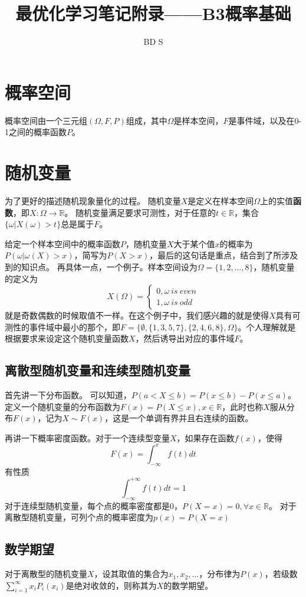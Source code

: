 \documentclass{article}
\title{最优化学习笔记附录——B3概率基础}
\author{BD S}
\begin{document}
\maketitle
\tableofcontents

\section{概率空间}
概率空间由一个三元组$(\Omega,F,P)$组成，其中$\Omega$是样本空间，$F$是事件域，以及在0-1之间的概率函数$P$。

\section{随机变量}
为了更好的描述随机现象量化的过程。
随机变量$X$是定义在样本空间$\Omega$上的实值\textbf{函数}，即$X:\Omega \rightarrow \mathbb{R}$。
随机变量满足要求可测性，对于任意的$t \in \mathbb{R}$，集合$\{\omega| X(\omega)>t\}$总是属于$F$。

给定一个样本空间中的概率函数$P$，随机变量$X$大于某个值$x$的概率为$P(\omega|\omega(X)>x)$，简写为$P(X>x)$，最后的这句话是重点，结合到了所涉及到的知识点。
再具体一点，一个例子。样本空间设为$\Omega =\{1,2,\dots,8\}$，随机变量的定义为
\begin{equation}
 X(\Omega)=\left\{
    \begin{aligned}
    0, \omega \ is \ even  \\
    1, \omega \ is \ odd  
    \end{aligned}
\right.   
\end{equation}
就是奇数偶数的时候取值不一样。在这个例子中，我们感兴趣的就是使得$X$具有可测性的事件域中最小的那个，即$F=\{\emptyset ,\{1,3,5,7\},\{2,4,6,8\},\Omega\}$。个人理解就是根据要求来设定这个随机变量函数$X$，然后诱导出对应的事件域$F$。
\subsection{离散型随机变量和连续型随机变量}
首先讲一下分布函数。
可以知道，$P(a<X \le b)=P(x \le b)-P(x \le a)$。
定义一个随机变量的分布函数为$F(x)=P(X \le x), x \in \mathbb{R}$，此时也称$X$服从分布$F(x)$，记为$X\sim F(x)$，这是一个单调有界并且右连续的函数。

再讲一下概率密度函数。对于一个连续型变量$X$，如果存在函数$f(x)$，使得$$
F(x)=\int_{-\infty}^x f(t)dt
$$
有性质$$
\int_{-\infty}^{+\infty} f(t)dt=1
$$
对于连续型随机变量，每个点的概率密度都是0，$P(X=x)=0,\forall x \in \mathbb{R}$。
对于离散型随机变量，可列个点的概率密度为$p(x)=P(X=x)$
\subsection{数学期望}
对于离散型的随机变量$X$，设其取值的集合为${x_1,x_2,\dots}$，分布律为$P(x)$，若级数
$\sum\limits_{i=1}^{\infty}x_iP_i(x_i)$是绝对收敛的，则称其为$X$的数学期望。
\end{document}
